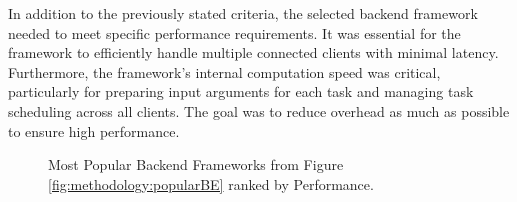 In addition to the previously stated criteria, the selected backend framework needed to meet specific performance requirements. It was essential for the framework to efficiently handle multiple connected clients with minimal latency. Furthermore, the framework's internal computation speed was critical, particularly for preparing input arguments for each task and managing task scheduling across all clients. The goal was to reduce overhead as much as possible to ensure high performance.
\begin{figure}[htbp]
  \myfloatalign
  \caption{Most Popular Backend Frameworks from Figure \ref{fig:methodology:popularBE} ranked by Performance.}
  \label{fig:methodology:benchmarkBE}
\end{figure}
